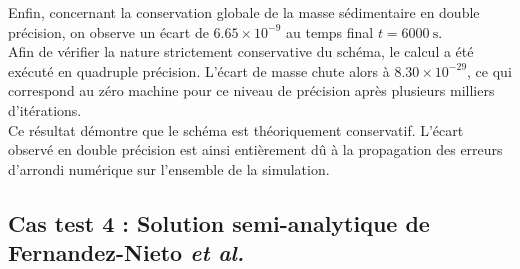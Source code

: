 \documentclass[11pt, a4paper, oneside]{report}
\begin{document}
Enfin, concernant la conservation globale de la masse sédimentaire en double précision, on observe un écart de $6.65 \times 10^{-9}$ au temps final $t = \SI{6000}{\second}$. \\
Afin de vérifier la nature strictement conservative du schéma, le calcul a été exécuté en quadruple précision. L'écart de masse chute alors à $8.30 \times 10^{-29}$, ce qui correspond au zéro machine pour ce niveau de précision après plusieurs milliers d'itérations. \\
Ce résultat démontre que le schéma est théoriquement conservatif. L'écart observé en double précision est ainsi entièrement dû à la propagation des erreurs d'arrondi numérique sur l'ensemble de la simulation.

\subsection{Cas test 4 : Solution semi-analytique de Fernandez-Nieto \textit{et al.}} \label{sec:Cas_test_2_4}
\end{document}
